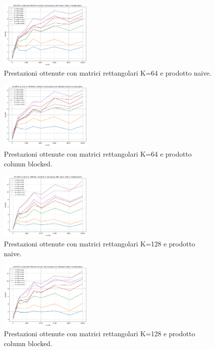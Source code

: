 \documentclass[conference]{IEEEtran}
\begin{document}
\begin{figure}[H]
    \centering
    \includegraphics[width=0.4\textwidth]{resources/rettangolari_k64_naive.png}
    \caption{Prestazioni ottenute con matrici rettangolari K=64 e prodotto naive.}
    \label{fig:rect_k64_matrix_naive}
\end{figure}
\begin{figure}[H]
    \centering
    \includegraphics[width=0.4\textwidth]{resources/rettangolari_k64_blocked.png}
    \caption{Prestazioni ottenute con matrici rettangolari K=64 e prodotto column blocked.}
    \label{fig:rect_k64_matrix_blocked}
\end{figure}
\begin{figure}[H]
    \centering
    \includegraphics[width=0.4\textwidth]{resources/rettangolari_k128_naive.png}
    \caption{Prestazioni ottenute con matrici rettangolari K=128 e prodotto naive.}
    \label{fig:rect_k128_matrix_naive}
\end{figure}
\begin{figure}[H]
    \centering
    \includegraphics[width=0.4\textwidth]{resources/rettangolari_k128_blocked.png}
    \caption{Prestazioni ottenute con matrici rettangolari K=128 e prodotto column blocked.}
    \label{fig:rect_k128_matrix_blocked}
\end{figure}
\end{document}
